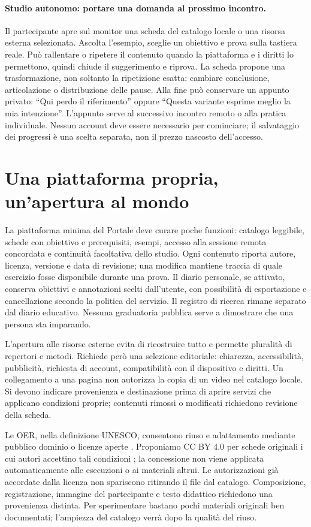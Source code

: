 \paragraph{Studio autonomo: portare una domanda al prossimo incontro.}
Il partecipante apre sul monitor una scheda del catalogo locale o una
risorsa esterna selezionata. Ascolta l'esempio, sceglie un obiettivo e
prova sulla tastiera reale. Può rallentare o ripetere il contenuto quando
la piattaforma e i diritti lo permettono, quindi chiude il suggerimento
e riprova. La scheda propone una trasformazione, non soltanto la ripetizione
esatta: cambiare conclusione, articolazione o distribuzione delle pause.
Alla fine può conservare un appunto privato: ``Qui perdo il riferimento''
oppure ``Questa variante esprime meglio la mia intenzione''. L'appunto
serve al successivo incontro remoto o alla pratica individuale. Nessun
account deve essere necessario per cominciare; il salvataggio dei progressi
è una scelta separata, non il prezzo nascosto dell'accesso.

\section{Una piattaforma propria, un'apertura al mondo}

La piattaforma minima del Portale deve curare poche funzioni: catalogo
leggibile, schede con obiettivo e prerequisiti, esempi, accesso alla sessione
remota concordata e continuità facoltativa dello studio. Ogni contenuto
riporta autore, licenza, versione e data di revisione; una modifica mantiene
traccia di quale esercizio fosse disponibile durante una prova. Il diario
personale, se attivato, conserva obiettivi e annotazioni scelti dall'utente,
con possibilità di esportazione e cancellazione secondo la politica del
servizio. Il registro di ricerca rimane separato dal diario educativo.
Nessuna graduatoria pubblica serve a dimostrare che una persona sta imparando.

L'apertura alle risorse esterne evita di ricostruire tutto e permette
pluralità di repertori e metodi. Richiede però una selezione editoriale:
chiarezza, accessibilità, pubblicità, richiesta di account, compatibilità
con il dispositivo e diritti. Un collegamento a una pagina non autorizza
la copia di un video nel catalogo locale. Si devono indicare provenienza
e destinazione prima di aprire servizi che applicano condizioni proprie;
contenuti rimossi o modificati richiedono revisione della scheda.

Le OER, nella definizione UNESCO, consentono riuso e adattamento mediante
pubblico dominio o licenze aperte \cite{unesco_oer2019}. Proponiamo CC BY 4.0
per schede originali i cui autori accettino tali condizioni
\cite{learn_ccby}; la concessione non viene applicata automaticamente alle
esecuzioni o ai materiali altrui. Le autorizzazioni già accordate dalla
licenza non spariscono ritirando il file dal catalogo. Composizione,
registrazione, immagine del partecipante e testo didattico richiedono una
provenienza distinta. Per sperimentare bastano pochi materiali originali
ben documentati; l'ampiezza del catalogo verrà dopo la qualità del riuso.

